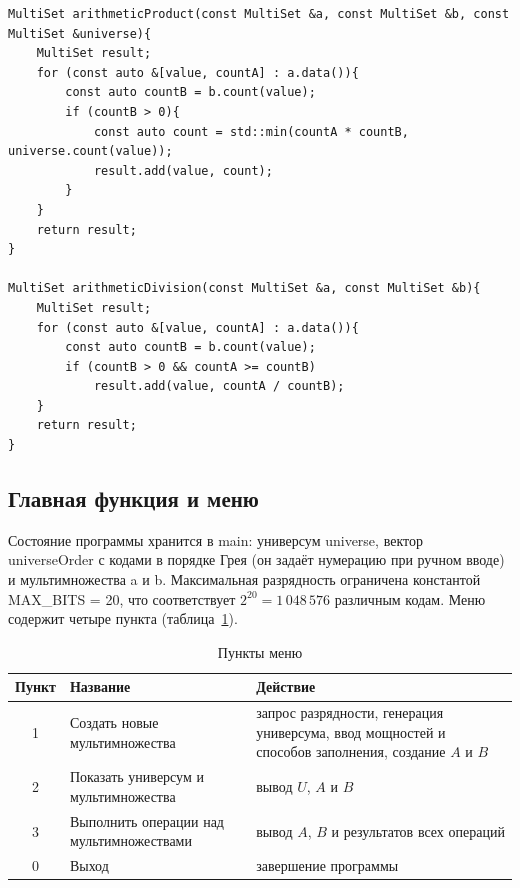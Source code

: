\documentclass[14pt,a4paper]{extreport}
\newcommand{\code}[1]{{\ttfamily #1}}
\begin{document}
\begin{listing}[H]
\begin{lstlisting}
MultiSet arithmeticProduct(const MultiSet &a, const MultiSet &b, const MultiSet &universe){
    MultiSet result;
    for (const auto &[value, countA] : a.data()){
        const auto countB = b.count(value);
        if (countB > 0){
            const auto count = std::min(countA * countB, universe.count(value));
            result.add(value, count);
        }
    }
    return result;
}

MultiSet arithmeticDivision(const MultiSet &a, const MultiSet &b){
    MultiSet result;
    for (const auto &[value, countA] : a.data()){
        const auto countB = b.count(value);
        if (countB > 0 && countA >= countB)
            result.add(value, countA / countB);
    }
    return result;
}
\end{lstlisting}
\end{listing}

\subsection{Главная функция и меню}

Состояние программы хранится в \code{main}: универсум \code{universe}, вектор \code{universeOrder} с кодами в порядке Грея (он задаёт нумерацию при ручном вводе) и мультимножества \code{a} и \code{b}. Максимальная разрядность ограничена константой \code{MAX\_BITS = 20}, что соответствует $2^{20}=1\,048\,576$ различным кодам. Меню содержит четыре пункта (таблица~\ref{tab:menu}).

\begin{table}[H]
\caption{Пункты меню}\label{tab:menu}
\small\singlespacing
\begin{tabularx}{\textwidth}{@{}c>{\raggedright\arraybackslash}p{6.2cm}X@{}}
\toprule
Пункт & Название & Действие \\
\midrule
1 & Создать новые мультимножества & запрос разрядности, генерация универсума, ввод мощностей и способов заполнения, создание $A$ и $B$ \\
2 & Показать универсум и мультимножества & вывод $U$, $A$ и $B$ \\
3 & Выполнить операции над мультимножествами & вывод $A$, $B$ и результатов всех операций \\
0 & Выход & завершение программы \\
\bottomrule
\end{tabularx}
\end{table}
\end{document}
